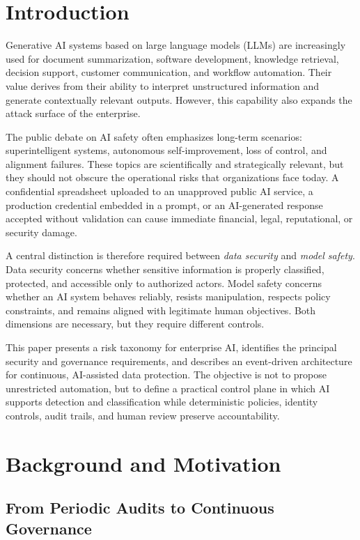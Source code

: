 \documentclass[conference]{IEEEtran}
\begin{document}
\section{Introduction}

Generative AI systems based on large language models (LLMs) are increasingly used for document summarization, software development, knowledge retrieval, decision support, customer communication, and workflow automation. Their value derives from their ability to interpret unstructured information and generate contextually relevant outputs. However, this capability also expands the attack surface of the enterprise.

The public debate on AI safety often emphasizes long-term scenarios: superintelligent systems, autonomous self-improvement, loss of control, and alignment failures. These topics are scientifically and strategically relevant, but they should not obscure the operational risks that organizations face today. A confidential spreadsheet uploaded to an unapproved public AI service, a production credential embedded in a prompt, or an AI-generated response accepted without validation can cause immediate financial, legal, reputational, or security damage.

A central distinction is therefore required between \emph{data security} and \emph{model safety}. Data security concerns whether sensitive information is properly classified, protected, and accessible only to authorized actors. Model safety concerns whether an AI system behaves reliably, resists manipulation, respects policy constraints, and remains aligned with legitimate human objectives. Both dimensions are necessary, but they require different controls.

This paper presents a risk taxonomy for enterprise AI, identifies the principal security and governance requirements, and describes an event-driven architecture for continuous, AI-assisted data protection. The objective is not to propose unrestricted automation, but to define a practical control plane in which AI supports detection and classification while deterministic policies, identity controls, audit trails, and human review preserve accountability.

\section{Background and Motivation}

\subsection{From Periodic Audits to Continuous Governance}
\end{document}
